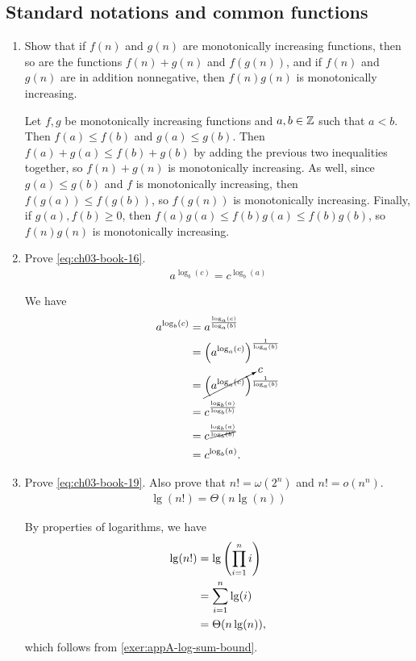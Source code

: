 \documentclass[Chapter03]{subfiles}
\begin{document}
	\subsection{Standard notations and common functions}

	\begin{enumerate}
		\item Show that if $f(n)$ and $g(n)$ are monotonically increasing functions, then so are the functions $f(n) + g(n)$ and $f(g(n))$, and if $f(n)$ and $g(n)$ are in addition nonnegative, then $f(n)g(n)$ is monotonically increasing.
		\begin{answer}
			Let $f,g$ be monotonically increasing functions and $a,b \in \mathbb{Z}$ such that $a < b$. Then $f(a) \leq f(b)$ and $g(a) \leq g(b)$. Then $f(a) + g(a) \leq f(b) + g(b)$ by adding the previous two inequalities together, so $f(n) + g(n)$ is monotonically increasing. As well, since $g(a) \leq g(b)$ and $f$ is monotonically increasing, then $f(g(a)) \leq f(g(b))$, so $f(g(n))$ is monotonically increasing. Finally, if $g(a),f(b) \geq 0$,  then $f(a)g(a) \leq f(b)g(a) \leq f(b)g(b)$, so $f(n)g(n)$ is monotonically increasing.
		\end{answer}

		\item Prove \cref{eq:ch03-book-16}.
		\begin{align}
			a^{\log_b(c)} = c^{\log_b(a)} \label{eq:ch03-book-16} \tag{3.16}
		\end{align}
		\begin{answer}
			We have
			\begin{align*}
				a^{\log_b(c)} &= a^{\frac{\log_a(c)}{\log_a(b)}}\\
					&= \qty(a^{\log_a(c)})^{\frac{1}{\log_a(b)}}\\
					&= \cancelto{c}{\qty(a^{\log_a(c)})}^{\frac{1}{\log_a(b)}}\\
					&= c^{\frac{\log_b(a)}{\log_b(b)}}\\
					&= c^{\frac{\log_b(a)}{\cancel{\log_b(b)}}}\\
					&= c^{\log_b(a)}.
			\end{align*}
		\end{answer}

		\item Prove \cref{eq:ch03-book-19}. Also prove that $n! = \omega(2^n)$ and $n! = o(n^n)$.
		\begin{align}
			\lg(n!) = \Theta(n \lg(n)) \label{eq:ch03-book-19} \tag{3.19}
		\end{align}
		\begin{answer}
			By properties of logarithms, we have
			\begin{align*}
				\lg(n!) &= \lg \qty(\prod_{i = 1}^n i)\\
					&= \sum_{i = 1}^n \lg(i)\\
					&= \Theta(n \lg(n)),
			\end{align*}
			which follows from \cref{exer:appA-log-sum-bound}.


\end{answer}
\end{enumerate}
\end{document}
